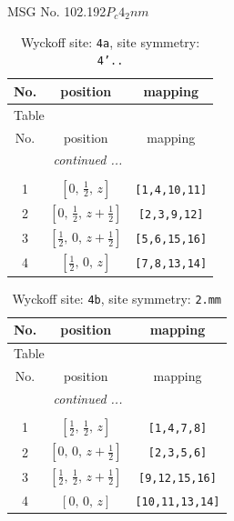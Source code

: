 \documentclass[fleqn,8pt]{jsarticle}
\begin{document}
\setcounter{MaxMatrixCols}{32}

\renewcommand{\tablename}{Table~}
\renewcommand{\figurename}{Figure~}
\begin{center}
\LARGE
MSG No. 102.192\quad$P_{c}4_{2}nm$
\end{center}
\renewcommand{\arraystretch}{1.2}
\begin{longtable}{ccc}
\caption{Wyckoff site: {\tt 4a}, site symmetry: {\tt 4'..}}
 \\
 \hline \hline
No. & position & mapping \\ \hline \endfirsthead

\multicolumn{2}{l}{\tablename\ \thetable{}} \\
 \hline \hline
No. & position & mapping \\ \hline \endhead

 \hline \hline
\multicolumn{2}{r}{\footnotesize\it continued ...} \\ \endfoot

 \hline \hline
\multicolumn{2}{r}{} \\ \endlastfoot

1 & $\left[ 0,\, \frac{1}{2},\, z \right]$ & {\tt [1,4,10,11]} \\ \hline
2 & $\left[ 0,\, \frac{1}{2},\, z + \frac{1}{2} \right]$ & {\tt [2,3,9,12]} \\ \hline
3 & $\left[ \frac{1}{2},\, 0,\, z + \frac{1}{2} \right]$ & {\tt [5,6,15,16]} \\ \hline
4 & $\left[ \frac{1}{2},\, 0,\, z \right]$ & {\tt [7,8,13,14]} \\
\end{longtable}
\renewcommand{\arraystretch}{1.2}
\begin{longtable}{ccc}
\caption{Wyckoff site: {\tt 4b}, site symmetry: {\tt 2.mm}}
 \\
 \hline \hline
No. & position & mapping \\ \hline \endfirsthead

\multicolumn{2}{l}{\tablename\ \thetable{}} \\
 \hline \hline
No. & position & mapping \\ \hline \endhead

 \hline \hline
\multicolumn{2}{r}{\footnotesize\it continued ...} \\ \endfoot

 \hline \hline
\multicolumn{2}{r}{} \\ \endlastfoot

1 & $\left[ \frac{1}{2},\, \frac{1}{2},\, z \right]$ & {\tt [1,4,7,8]} \\ \hline
2 & $\left[ 0,\, 0,\, z + \frac{1}{2} \right]$ & {\tt [2,3,5,6]} \\ \hline
3 & $\left[ \frac{1}{2},\, \frac{1}{2},\, z + \frac{1}{2} \right]$ & {\tt [9,12,15,16]} \\ \hline
4 & $\left[ 0,\, 0,\, z \right]$ & {\tt [10,11,13,14]} \\
\end{longtable}
\end{document}
